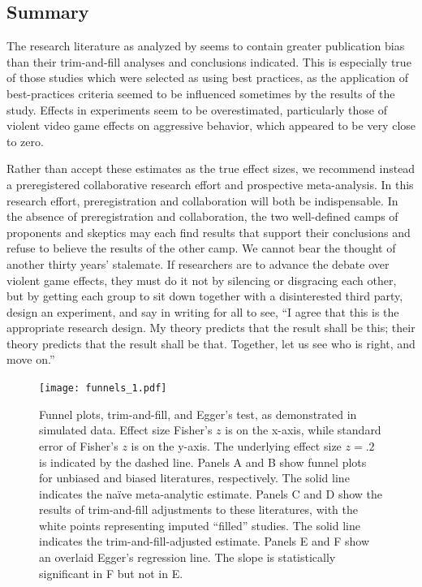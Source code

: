 \documentclass[man, mask]{apa6}
\begin{document}
\subsection{Summary}
The research literature as analyzed by \citet{Anderson:etal:2010} seems to contain greater publication bias than their trim-and-fill analyses and conclusions indicated. This is especially true of those studies which were selected as using best practices, as the application of best-practices criteria seemed to be influenced sometimes by the results of the study. Effects in experiments seem to be overestimated, particularly those of violent video game effects on aggressive behavior, which appeared to be very close to zero. 

Rather than accept these estimates as the true effect sizes, we recommend instead a preregistered collaborative research effort and prospective meta-analysis. In this research effort, preregistration and collaboration will both be indispensable. In the absence of preregistration and collaboration, the two well-defined camps of proponents and skeptics may each find results that support their conclusions and refuse to believe the results of the other camp. We cannot bear the thought of another thirty years' stalemate. If researchers are to advance the debate over violent game effects, they must do it not by silencing or disgracing each other, but by getting each group to sit down together with a disinterested third party, design an experiment, and say in writing for all to see, ``I agree that this is the appropriate research design. My theory predicts that the result shall be this; their theory predicts that the result shall be that. Together, let us see who is right, and move on.''

\newpage



\begin{figure}
	\texttt{[image: funnels\_1.pdf]}
	\caption{Funnel plots, trim-and-fill, and Egger's test, as demonstrated in simulated data. Effect size Fisher's $z$ is on the x-axis, while standard error of Fisher's $z$ is on the y-axis. The underlying effect size $z = .2$ is indicated by the dashed line. Panels A and B show funnel plots for unbiased and biased literatures, respectively. The solid line indicates the na{\"i}ve meta-analytic estimate. Panels C and D show the results of trim-and-fill adjustments to these literatures, with the white points representing imputed ``filled'' studies. The solid line indicates the trim-and-fill-adjusted estimate. Panels E and F show an overlaid Egger's regression line. The slope is statistically significant in F but not in E.}
	\label{funnels1}
\end{figure}
\end{document}
